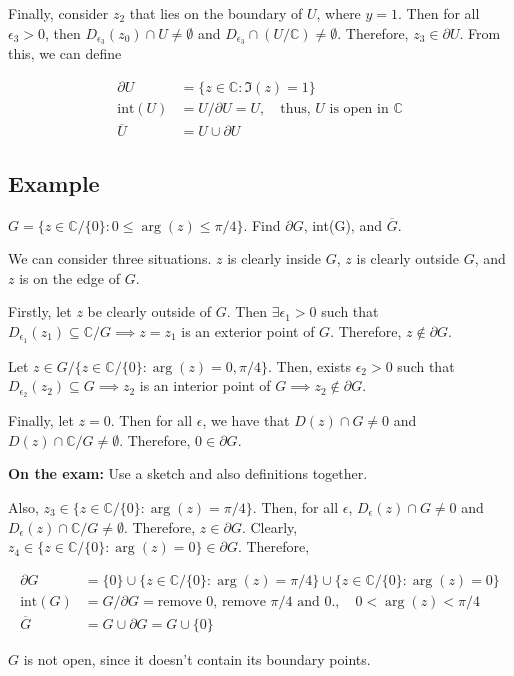 \documentclass{article}
\newtheorem{one minute paper}[theorem]{One Minute Paper}
\begin{document}
Finally, consider $z_2$ that lies on the boundary of $U$, where $y=1$. Then for all $\epsilon_3 > 0$, then $D_{\epsilon_3}(z_0) \cap U \neq \emptyset$ and $D_{\epsilon_3} \cap (U / \mathbb{C}) \neq \emptyset$. Therefore, $z_3 \in \partial U$. From this, we can define 

\begin{align}
    \partial U &= \{z \in \mathbb{C}: \Im(z) = 1\} \\
    \text{int}(U) &= U/\partial U = U, \quad \text{thus, $U$ is open in $\mathbb{C}$}\\
    \overline{U} &= U \cup \partial U
\end{align}

\subsection*{Example}

$G = \{z \in \mathbb{C}/\{0\}: 0 \leq \arg(z) \leq \pi/4\}$. Find $\partial G$, int(G), and $\overline{G}$. 

We can consider three situations. $z$ is clearly inside $G$, $z$ is clearly outside $G$, and $z$ is on the edge of $G$.  

Firstly, let $z$ be clearly outside of $G$. Then $\exists \epsilon_1 > 0$ such that $D_{\epsilon_1}(z_1) \subseteq \mathbb{C}/G \implies z = z_1$ is an exterior point of $G$. Therefore, $z \notin \partial G$.

Let $z \in G /\{z \in \mathbb{C}/\{0\} : \arg(z) = 0, \pi/4\}$. Then, exists $\epsilon_2 > 0$ such that $D_{\epsilon_2}(z_2) \subseteq G \implies z_2$ is an interior point of $G \implies z_2 \notin \partial G$. 

Finally, let $z=0$. Then for all $\epsilon$, we have that $D(z) \cap G \neq 0$ and $D(z) \cap \mathbb{C}/G \neq \emptyset$. Therefore, $0 \in \partial G$. 

\textbf{On the exam:} Use a sketch and also definitions together. 

Also, $z_3 \in \{z \in \mathbb{C}/ \{0\}: \arg(z) = \pi/4\}$. Then, for all $\epsilon$, $D_{\epsilon}(z) \cap G \neq 0$ and $D_{\epsilon}(z) \cap \mathbb{C}/G \neq \emptyset$. Therefore, $z \in \partial G$. Clearly, $z_4 \in \{z \in \mathbb{C}/\{0\}: \arg(z) = 0\} \in \partial G$. Therefore, 

\begin{align}
    \partial G &= \{0\} \cup \{z \in \mathbb{C}/\{0\}: \arg(z) = \pi/4\} \cup \{z \in \mathbb{C}/\{0\}: \arg(z) = 0\} \\
    \text{int}(G) &= G/\partial G = \text{remove 0, remove $\pi/4$ and $0$.}, \quad 0< \arg(z) < \pi/4 \\
    \overline{G} &= G \cup \partial G = G \cup \{0\}
\end{align}

$G$ is not open, since it doesn't contain its boundary points. 
\end{document}
